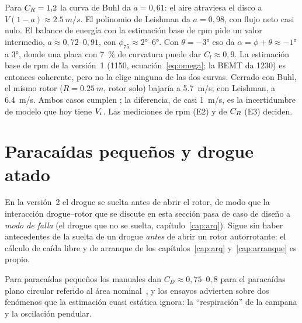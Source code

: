 \begin{resultado}
Para $C_{R}=1{,}2$ la curva de Buhl da $a=0{,}61$: el aire atraviesa el disco a
$V(1-a)\approx\SI{2.5}{m/s}$. El polinomio de Leishman da $a=0{,}98$, con flujo neto
casi nulo. El balance de energía con la estimación base de rpm pide un valor intermedio,
$a\approx0{,}72$--$0{,}91$, con $\phi_{75}\approx\ang{2}$--\ang{6}. Con
$\theta=\ang{-3}$ eso da $\alpha=\phi+\theta\approx\ang{-1}$ a \ang{3}, donde una placa
con \SI{7}{\percent} de curvatura puede dar $C_l\approx0{,}9$. La estimación base de
rpm de la versión~1 (\num{1150}, ecuación~\eqref{eq:omega}; la BEMT da \num{1230}) es entonces coherente, pero no la elige
ninguna de las dos curvas. Cerrado con Buhl, el mismo rotor ($R=\SI{0.25}{m}$, rotor solo) bajaría a
\SI{5.7}{m/s}; con Leishman, a \SI{6.4}{m/s}. Ambos casos cumplen
; la diferencia, de casi \SI{1}{m/s}, es la incertidumbre de modelo que hoy
tiene $V_{\mathrm{r}}$. Las mediciones de rpm (E2) y de $C_{R}$ (E3) deciden.
\end{resultado}

\section{Paracaídas pequeños y drogue atado}\label{sec:literatura-paracaidas}
\begin{nota}
En la versión~2 el drogue se suelta antes de abrir el rotor, de modo que la interacción drogue--rotor que se discute en esta sección pasa de caso de diseño a
\emph{modo de falla} (el drogue que no se suelta, capítulo~\ref{cap:arq}). Sigue sin haber antecedentes de la suelta de un drogue \emph{antes} de abrir un rotor autorrotante: el cálculo de caída libre y de arranque de los capítulos~\ref{cap:arq} y~\ref{cap:arranque} es propio.
\end{nota}

Para paracaídas pequeños los manuales dan $C_D\approx0{,}75$--$0{,}8$ para el
paracaídas plano circular referido al área nominal~\cite{knacke1992}, y los ensayos
advierten sobre dos fenómenos que la estimación cuasi estática ignora: la
``respiración'' de la campana y la oscilación pendular.

